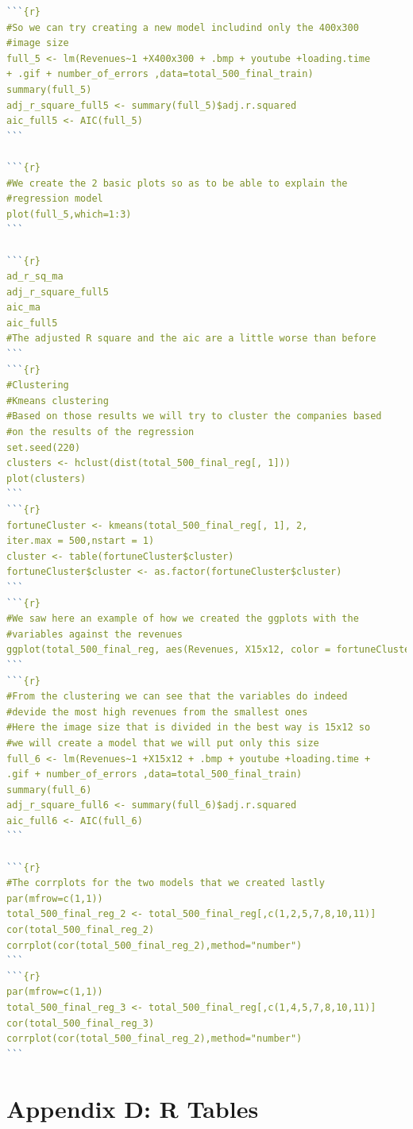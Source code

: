 \documentclass{book}
\begin{document}
\begin{lstlisting}[language=R]
```{r}
#So we can try creating a new model includind only the 400x300 
#image size 
full_5 <- lm(Revenues~1 +X400x300 + .bmp + youtube +loading.time 
+ .gif + number_of_errors ,data=total_500_final_train)
summary(full_5)
adj_r_square_full5 <- summary(full_5)$adj.r.squared
aic_full5 <- AIC(full_5)
```

```{r}
#We create the 2 basic plots so as to be able to explain the 
#regression model
plot(full_5,which=1:3)
```

```{r}
ad_r_sq_ma
adj_r_square_full5 
aic_ma 
aic_full5 
#The adjusted R square and the aic are a little worse than before
```
```{r}
#Clustering 
#Kmeans clustering
#Based on those results we will try to cluster the companies based 
#on the results of the regression
set.seed(220)
clusters <- hclust(dist(total_500_final_reg[, 1]))
plot(clusters)
```
```{r}
fortuneCluster <- kmeans(total_500_final_reg[, 1], 2, 
iter.max = 500,nstart = 1)
cluster <- table(fortuneCluster$cluster)
fortuneCluster$cluster <- as.factor(fortuneCluster$cluster)
```
```{r}
#We saw here an example of how we created the ggplots with the 
#variables against the revenues
ggplot(total_500_final_reg, aes(Revenues, X15x12, color = fortuneCluster$cluster)) + geom_point(size=3)
```
```{r}
#From the clustering we can see that the variables do indeed
#devide the most high revenues from the smallest ones
#Here the image size that is divided in the best way is 15x12 so 
#we will create a model that we will put only this size
full_6 <- lm(Revenues~1 +X15x12 + .bmp + youtube +loading.time + 
.gif + number_of_errors ,data=total_500_final_train)
summary(full_6)
adj_r_square_full6 <- summary(full_6)$adj.r.squared
aic_full6 <- AIC(full_6)
```

```{r}
#The corrplots for the two models that we created lastly
par(mfrow=c(1,1))
total_500_final_reg_2 <- total_500_final_reg[,c(1,2,5,7,8,10,11)]
cor(total_500_final_reg_2)
corrplot(cor(total_500_final_reg_2),method="number")
```
```{r}
par(mfrow=c(1,1))
total_500_final_reg_3 <- total_500_final_reg[,c(1,4,5,7,8,10,11)]
cor(total_500_final_reg_3)
corrplot(cor(total_500_final_reg_2),method="number")
```

\end{lstlisting} 


\section{Appendix D: R Tables} \label{appR}
\end{document}
